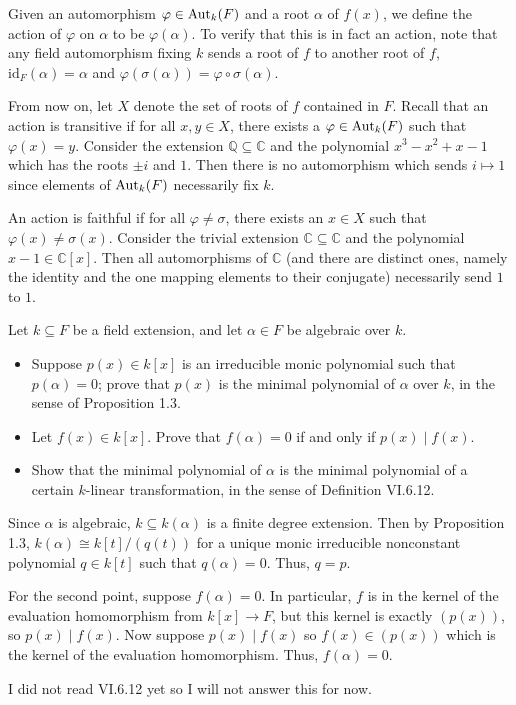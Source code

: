 \documentclass[../../master.tex]{subfiles}
\begin{document}
\begin{solution}
    Given an automorphism $\varphi \in \operatorname{Aut}_k(F)$ and a root $\alpha$ of $f(x)$, we define the action of $\varphi$ on $\alpha$ to be $\varphi(\alpha)$.
    To verify that this is in fact an action, note that any field automorphism fixing $k$ sends a root of $f$ to another root of $f$, $\text{id}_F(\alpha) = \alpha$ and $\varphi( \sigma(\alpha)) = \varphi \circ \sigma(\alpha)$.

    From now on, let $X$ denote the set of roots of $f$ contained in $F$.
    Recall that an action is transitive if for all $x, y \in X$, there exists a $\varphi \in \operatorname{Aut}_k(F)$ such that $\varphi(x) = y$.
    Consider the extension $\mathbb{Q} \subseteq \mathbb{C}$ and the polynomial $x^3 - x^2 + x - 1$ which has the roots $\pm i$ and $1$.
    Then there is no automorphism which sends $i \mapsto 1$ since elements of $\operatorname{Aut}_k(F)$ necessarily fix $k$.

    An action is faithful if for all $\varphi \neq \sigma$, there exists an $x \in X$ such that $\varphi(x) \neq \sigma(x)$.
    Consider the trivial extension $\mathbb{C} \subseteq \mathbb{C}$ and the polynomial $x - 1 \in \mathbb{C}[x]$.
    Then all automorphisms of $\mathbb{C}$ (and there are distinct ones, namely the identity and the one mapping elements to their conjugate) necessarily send $1$ to $1$.
\end{solution}

\begin{problem}
    Let $k \subseteq F$ be a field extension, and let $\alpha \in F$ be algebraic over $k$.
    \begin{itemize}
        \item Suppose $p(x) \in k[x]$ is an irreducible monic polynomial such that $p(\alpha) = 0$;
            prove that $p(x)$ is the minimal polynomial of $\alpha$ over $k$, in the sense of Proposition 1.3.
        \item Let $f(x) \in k[x]$.
            Prove that $f(\alpha) = 0$ if and only if $p(x) \mid f(x)$.
        \item Show that the minimal polynomial of $\alpha$ is the minimal polynomial of a certain $k$-linear transformation, in the sense of Definition VI.6.12.
    \end{itemize}
\end{problem}

\begin{solution}
    Since $\alpha$ is algebraic, $k \subseteq k(\alpha)$ is a finite degree extension.
    Then by Proposition 1.3, $k(\alpha) \cong k[t] / (q(t))$ for a unique monic irreducible nonconstant polynomial $q \in k[t]$ such that $q(\alpha) = 0$.
    Thus, $q = p$.

    For the second point, suppose $f(\alpha) = 0$.
    In particular, $f$ is in the kernel of the evaluation homomorphism from $k[x] \to F$, but this kernel is exactly $(p(x))$, so $p(x) \mid f(x)$.
    Now suppose $p(x) \mid f(x)$ so $f(x) \in (p(x))$ which is the kernel of the evaluation homomorphism.
    Thus, $f(\alpha) = 0$.

    I did not read VI.6.12 yet so I will not answer this for now.
\end{solution}
\end{document}
